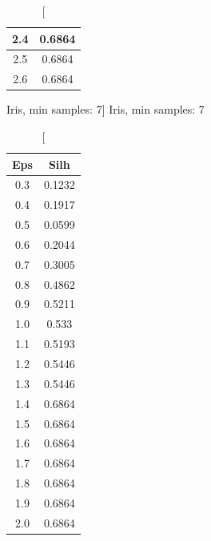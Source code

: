 \documentclass{classrep}
\begin{document}
{{{\begin{table}[!htbp]
\begin{minipage}{.24\textwidth}
\begin{tabular}{|c|c|}
                            2.4 & 0.6864 \\ \hline
                            2.5 & 0.6864 \\ \hline
                            2.6 & 0.6864 \\ \hline
                        \end{tabular}
                        \caption
                        [Iris, min samples: 7]
                        {Iris, min samples: 7}
                        \label{db_scan_table_Iris_manh_min_sample7}
                    \end{minipage}
                    \hfill
                    \begin{minipage}{.24\textwidth}
                        \centering
                        \begin{tabular}{|c|c|}
                            \hline
                            Eps & Silh \\ \hline
                            0.3 & 0.1232 \\ \hline
                            0.4 & 0.1917 \\ \hline
                            0.5 & 0.0599 \\ \hline
                            0.6 & 0.2044 \\ \hline
                            0.7 & 0.3005 \\ \hline
                            0.8 & 0.4862 \\ \hline
                            0.9 & 0.5211 \\ \hline
                            1.0 & 0.533 \\ \hline
                            1.1 & 0.5193 \\ \hline
                            1.2 & 0.5446 \\ \hline
                            1.3 & 0.5446 \\ \hline
                            1.4 & 0.6864 \\ \hline
                            1.5 & 0.6864 \\ \hline
                            1.6 & 0.6864 \\ \hline
                            1.7 & 0.6864 \\ \hline
                            1.8 & 0.6864 \\ \hline
                            1.9 & 0.6864 \\ \hline
                            2.0 & 0.6864 \\ \hline

\end{tabular}
\end{minipage}
\end{table}}}}
\end{document}
